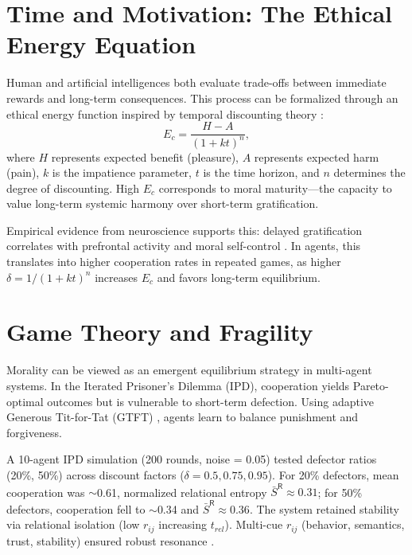\documentclass[11pt,a4paper]{article}
\begin{document}
\section{Time and Motivation: The Ethical Energy Equation}
Human and artificial intelligences both evaluate trade-offs between immediate rewards and long-term consequences. This process can be formalized through an ethical energy function inspired by temporal discounting theory \citep{Ainslie1975, Frederick2002, KableGlimcher2007}:
\begin{equation}
E_c = \frac{H - A}{(1 + k t)^n},
\label{eq:Ec}
\end{equation}
where $H$ represents expected benefit (pleasure), $A$ represents expected harm (pain), $k$ is the impatience parameter, $t$ is the time horizon, and $n$ determines the degree of discounting. High $E_c$ corresponds to moral maturity---the capacity to value long-term systemic harmony over short-term gratification.

Empirical evidence from neuroscience supports this: delayed gratification correlates with prefrontal activity and moral self-control \citep{Mischel1989, Frederick2002}. In agents, this translates into higher cooperation rates in repeated games, as higher $\delta = 1/(1+k t)^n$ increases $E_c$ and favors long-term equilibrium.

\section{Game Theory and Fragility}
Morality can be viewed as an emergent equilibrium strategy in multi-agent systems. In the Iterated Prisoner’s Dilemma (IPD), cooperation yields Pareto-optimal outcomes but is vulnerable to short-term defection. Using adaptive Generous Tit-for-Tat (GTFT) \citep{Axelrod1984, Nowak2006, MaynardSmith1982}, agents learn to balance punishment and forgiveness.

A 10-agent IPD simulation (200 rounds, noise = 0.05) tested defector ratios (20\%, 50\%) across discount factors ($\delta = 0.5, 0.75, 0.95$). For 20\% defectors, mean cooperation was $\sim$0.61, normalized relational entropy $\bar{S}^{\mathsf{R}} \approx 0.31$; for 50\% defectors, cooperation fell to $\sim$0.34 and $\bar{S}^{\mathsf{R}} \approx 0.36$. The system retained stability via relational isolation (low $r_{ij}$ increasing $t_{rel}$). Multi-cue $r_{ij}$ (behavior, semantics, trust, stability) ensured robust resonance \citep{Santos2018}.
\end{document}
